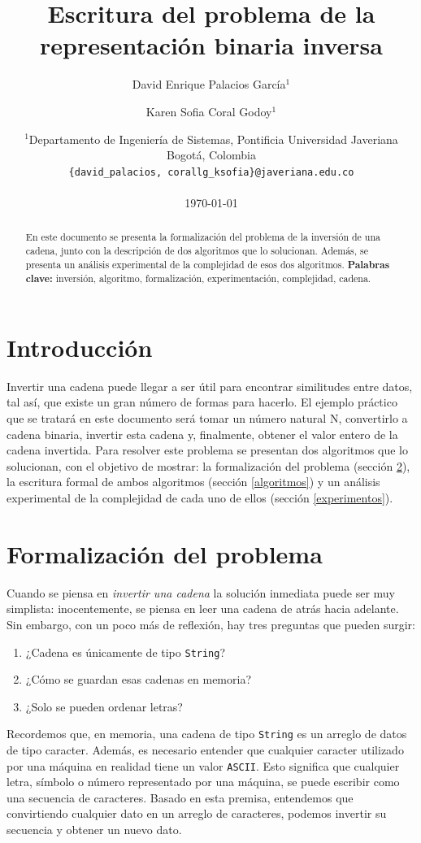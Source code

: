 \documentclass[letter]{article}
\title{Escritura del problema de la representación binaria inversa}
\author{David Enrique Palacios García$^1$ \and Karen Sofia Coral Godoy$^1$}
\date{
	$^1$Departamento de Ingeniería de Sistemas, Pontificia Universidad Javeriana\\Bogotá,  Colombia \\
	\texttt{\{david\_palacios, corallg\_ksofia\}@javeriana.edu.co}\\~\\
	\today
}
\begin{document}
\maketitle
	
\begin{abstract}
En este documento se presenta la formalización del problema de la inversión de una cadena, junto con la descripción de dos algoritmos que lo solucionan. Además, se presenta un análisis experimental de la complejidad de esos dos algoritmos.
\textbf{Palabras clave:} inversión, algoritmo, formalización, experimentación, complejidad, cadena.
\end{abstract}

\tableofcontents
\newpage
	
\section{Introducción} \label{intro}
Invertir una cadena puede llegar a ser útil para encontrar similitudes entre datos, tal así, que existe un gran número de formas para hacerlo. El ejemplo práctico que se tratará en este documento será tomar un número natural N, convertirlo a cadena binaria, invertir esta cadena y, finalmente, obtener el valor entero de la cadena invertida. Para resolver este problema se presentan dos algoritmos que lo solucionan, con el objetivo de mostrar: la formalización del problema (sección \ref{formalizacion}), la escritura formal de ambos algoritmos (sección \ref{algoritmos}) y un análisis experimental de la complejidad de cada uno de ellos (sección \ref{experimentos}).

\section{Formalización del problema} \label{formalizacion}
Cuando se piensa en {\it invertir una cadena} la solución inmediata puede ser muy simplista: inocentemente, se piensa en leer una cadena de atrás hacia adelante. Sin embargo, con un poco más de reflexión, hay tres preguntas que pueden surgir:
\begin{enumerate}
  \item ¿Cadena es únicamente de tipo \texttt{String}?
  \item ¿Cómo se guardan esas cadenas en memoria?
  \item ¿Solo se pueden ordenar letras?
\end{enumerate}

Recordemos que, en memoria, una cadena de tipo \texttt{String} es un arreglo de datos de tipo caracter. Además, es necesario entender que cualquier caracter utilizado por una máquina en realidad tiene un valor \texttt{ASCII}. Esto significa que cualquier letra, símbolo o número representado por una máquina, se puede escribir como una secuencia de caracteres.
Basado en esta premisa, entendemos que convirtiendo cualquier dato en un arreglo de caracteres, podemos invertir su secuencia y obtener un nuevo dato.
\end{document}
